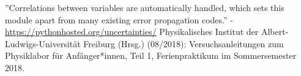 \documentclass[11pt,a4paper]{article}
\begin{document}
\begin{thebibliography}{9}
''Correlations between variables are automatically handled, which sets this module apart from many existing error propagation codes.'' - \url{https://pythonhosted.org/uncertainties/}
 Physikalisches Institut der Albert-Ludwigs-Universität Freiburg (Hrsg.) (08/2018): Versuchsanleitungen zum Physiklabor für Anfänger*innen, Teil 1, Ferienpraktikum im Sommersemester 2018.
\end{thebibliography}
\end{document}
